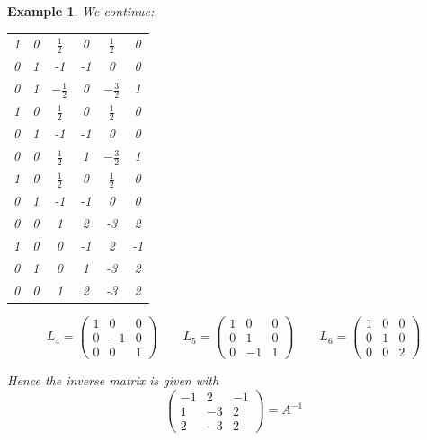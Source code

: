 \documentclass[a4paper,landscape,twocolumn]{article}
\newtheorem{ex}{Example}
\begin{document}
\begin{ex}
  We continue:
  \begin{tabular}{ccc|ccc}
      1 & 0 & $\frac12$ & 0 & $\frac12$ & 0 \\
      0 & 1 & -1 & -1 & 0 & 0 \\
      0 & 1 & $-\frac12$ & 0 & $-\frac32$ & 1 \\
    \hline
      1 & 0 & $\frac12$ & 0 & $\frac12$ & 0 \\
      0 & 1 & -1 & -1 & 0 & 0 \\
      0 & 0 & $\frac12$ & 1 & $-\frac32$ & 1 \\
    \hline
      1 & 0 & $\frac12$ & 0 & $\frac12$ & 0 \\
      0 & 1 & -1 & -1 & 0 & 0 \\
      0 & 0 & 1 & 2 & -3 & 2 \\
    \hline
      1 & 0 & 0 & -1 & 2 & -1 \\
      0 & 1 & 0 & 1 & -3 & 2 \\
      0 & 0 & 1 & 2 & -3 & 2
  \end{tabular}
  \[
    L_4 = \begin{pmatrix}
      1 &  0 & 0 \\
      0 & -1 & 0 \\
      0 &  0 & 1
    \end{pmatrix}
    \qquad
    L_5 = \begin{pmatrix}
      1 &  0 & 0 \\
      0 &  1 & 0 \\
      0 & -1 & 1
    \end{pmatrix}
    \qquad
    L_6 = \begin{pmatrix}
      1 & 0 & 0 \\
      0 & 1 & 0 \\
      0 & 0 & 2
    \end{pmatrix}
  \]

  Hence the inverse matrix is given with
  \[
    \begin{pmatrix}
      -1 & 2 & -1 \\
       1 & -3 & 2 \\
       2 & -3 & 2
    \end{pmatrix}
    = A^{-1}
  \]
\end{ex}
\end{document}
